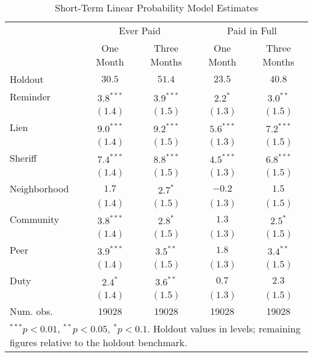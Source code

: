 \begin{table}[htb]
\centering
\caption{Short-Term Linear Probability Model Estimates} \label{sh_lin}
\bigskip
\begin{tabular}{l c c c c }
\hline
 & \multicolumn{2}{c}{Ever Paid} & \multicolumn{2}{c}{Paid in Full} \\
          & One Month & Three Months & One Month & Three Months \\
Holdout   & $30.5$ & $51.4$ & $23.5$ & $40.8$ \\
\hline
Reminder   & $3.8^{***}$  & $3.9^{***}$  & $2.2^{*}$    & $3.0^{**}$   \\
          & $(1.4)$      & $(1.5)$      & $(1.3)$      & $(1.5)$      \\
Lien      & $9.0^{***}$  & $9.2^{***}$  & $5.6^{***}$  & $7.2^{***}$  \\
          & $(1.4)$      & $(1.5)$      & $(1.3)$      & $(1.5)$      \\
Sheriff   & $7.4^{***}$  & $8.8^{***}$  & $4.5^{***}$  & $6.8^{***}$  \\
          & $(1.4)$      & $(1.5)$      & $(1.3)$      & $(1.5)$      \\
Neighborhood & $1.7$        & $2.7^{*}$    & $-0.2$       & $1.5$        \\
          & $(1.4)$      & $(1.5)$      & $(1.3)$      & $(1.5)$      \\
Community     & $3.8^{***}$  & $2.8^{*}$    & $1.3$        & $2.5^{*}$    \\
          & $(1.4)$      & $(1.5)$      & $(1.3)$      & $(1.5)$      \\
Peer      & $3.9^{***}$  & $3.5^{**}$   & $1.8$        & $3.4^{**}$   \\
          & $(1.4)$      & $(1.5)$      & $(1.3)$      & $(1.5)$      \\          
Duty      & $2.4^{*}$    & $3.6^{**}$   & $0.7$        & $2.3$        \\
          & $(1.4)$      & $(1.5)$      & $(1.3)$      & $(1.5)$      \\
\hline
Num. obs. & 19028        & 19028        & 19028        & 19028        \\
\hline
\multicolumn{5}{l}{\scriptsize{$^{***}p<0.01$, $^{**}p<0.05$,
    $^*p<0.1$. Holdout values in levels; remaining figures relative to
    the holdout benchmark.}}
\end{tabular}
\end{table}

